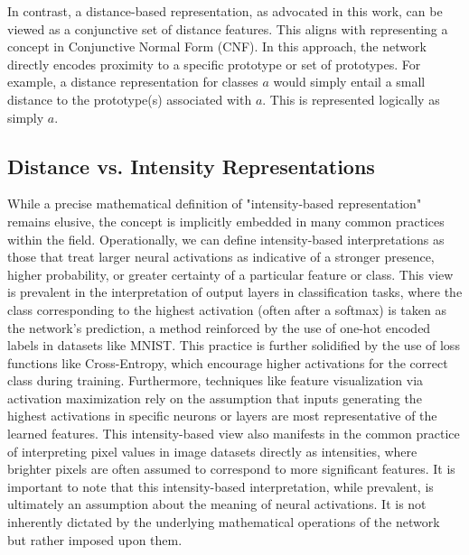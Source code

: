 In contrast, a distance-based representation, as advocated in this work, can be viewed as a conjunctive set of distance features. This aligns with representing a concept in Conjunctive Normal Form (CNF). In this approach, the network directly encodes proximity to a specific prototype or set of prototypes. For example, a distance representation for classes $a$ would simply entail a small distance to the prototype(s) associated with $a$. This is represented logically as simply $a$.

\subsection{Distance vs. Intensity Representations}
\label{subsec:dist-intensity-rep}

While a precise mathematical definition of "intensity-based representation" remains elusive, the concept is implicitly embedded in many common practices within the field. Operationally, we can define intensity-based interpretations as those that treat larger neural activations as indicative of a stronger presence, higher probability, or greater certainty of a particular feature or class. This view is prevalent in the interpretation of output layers in classification tasks, where the class corresponding to the highest activation (often after a softmax) is taken as the network's prediction, a method reinforced by the use of one-hot encoded labels in datasets like MNIST. This practice is further solidified by the use of loss functions like Cross-Entropy, which encourage higher activations for the correct class during training.  Furthermore, techniques like feature visualization via activation maximization \cite{erhan2009visualizing, olah2017feature} rely on the assumption that inputs generating the highest activations in specific neurons or layers are most representative of the learned features. This intensity-based view also manifests in the common practice of interpreting pixel values in image datasets directly as intensities, where brighter pixels are often assumed to correspond to more significant features. It is important to note that this intensity-based interpretation, while prevalent, is ultimately an assumption about the meaning of neural activations. It is not inherently dictated by the underlying mathematical operations of the network but rather imposed upon them.

